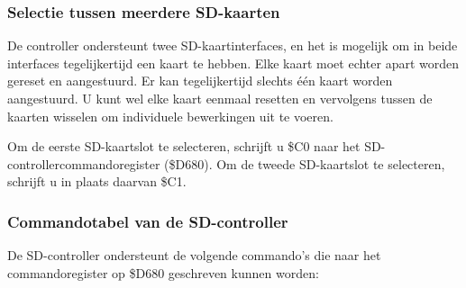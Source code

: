 \subsubsection{Selectie tussen meerdere SD-kaarten}

De controller ondersteunt twee SD-kaartinterfaces, en het is mogelijk om in beide interfaces tegelijkertijd een kaart te hebben. Elke kaart moet echter apart worden gereset en aangestuurd. Er kan tegelijkertijd slechts één kaart worden aangestuurd. U kunt wel elke kaart eenmaal resetten en vervolgens tussen de kaarten wisselen om individuele bewerkingen uit te voeren.

Om de eerste SD-kaartslot te selecteren, schrijft u \$C0 naar het SD-controllercommandoregister (\$D680). Om de tweede SD-kaartslot te selecteren, schrijft u in plaats daarvan \$C1.

\subsubsection{Commandotabel van de SD-controller}

De SD-controller ondersteunt de volgende commando's die naar het commandoregister op \$D680 geschreven kunnen worden:

